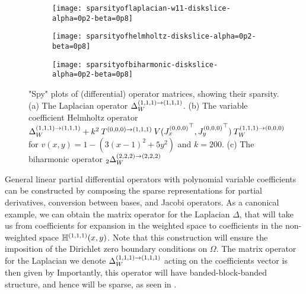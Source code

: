 \begin{figure}[tp]
	\centering %
	\begin{subfigure}{0.5\textwidth}
		\centerline{\texttt{[image: sparsityoflaplacian-w11-diskslice-alpha=0p2-beta=0p8]}}
		\centering
		\caption{}
	\end{subfigure}\hfil %
	\begin{subfigure}{0.5\textwidth}
		\centerline{\texttt{[image: sparsityofhelmholtz-diskslice-alpha=0p2-beta=0p8]}}
		\centering
		\caption{}
	\end{subfigure}\hfil %

	\medskip
	\begin{subfigure}{0.5\textwidth}
		\centerline{\texttt{[image: sparsityofbiharmonic-diskslice-alpha=0p2-beta=0p8]}}
		\centering
		\caption{}
	\end{subfigure}\hfil %
    	\caption{"Spy" plots of (differential) operator matrices, showing their sparsity. (a) The Laplacian operator $\Delta_W^{(1,1,1)\to(1,1,1)}$. (b) The variable coefficient Helmholtz operator $\Delta_W^{(1,1,1)\to(1,1,1)} + k^2 \: T^{(0,0,0)\to(1,1,1)} \: V({J_x^{(0,0,0)}}^\top, {J_y^{(0,0,0)}}^\top) \: T_W^{(1,1,1)\to(0,0,0)}$ for $v(x,y) = 1 - (3(x-1)^2 + 5y^2)$ and $k = 200$. (c) The biharmonic operator $_2\Delta_W^{(2,2,2)\to(2,2,2)}$}
	\label{fig:ds:sparsity}
\end{figure}

General linear partial differential operators with polynomial variable coefficients can be constructed by composing the sparse representations for partial derivatives, conversion between bases, and Jacobi operators. As a canonical example, we can obtain the matrix operator for the Laplacian $\Delta$, that will take us from coefficients for expansion in the weighted space
to coefficients in the non-weighted space ${\mathbb{H}^{(1,1,1)}}(x,y)$. Note that this construction will ensure the imposition of the Dirichlet zero boundary conditions on $\Omega$. The matrix operator for the Laplacian we denote $\Delta_W^{(1,1,1)\to(1,1,1)}$ acting on the coefficients vector is then given by
Importantly, this operator will have banded-block-banded structure, and hence will be sparse, as seen in .

